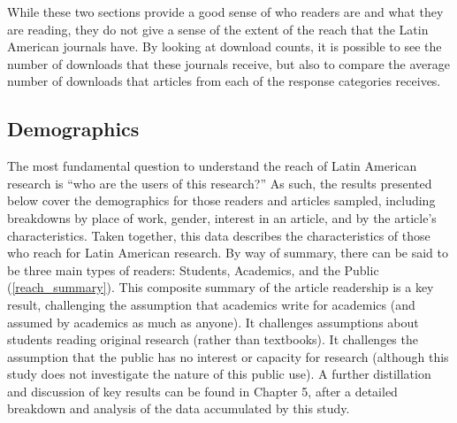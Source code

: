 While these two sections provide a good sense of who readers are and what they are reading, they do not give a sense of the extent of the reach that the Latin American journals have. By looking at download counts, it is possible to see the number of downloads that these journals receive, but also to compare the average number of downloads that articles from each of the response categories receives.

\subsection{Demographics}
\label{demographics}

The most fundamental question to understand the reach of Latin American research is ``who are the users of this research?'' As such, the results presented below cover the demographics for those readers and articles sampled, including breakdowns by place of work, gender, interest in an article, and by the article's characteristics. Taken together, this data describes the characteristics of those who reach for Latin American research. By way of summary, there can be said to be three main types of readers: Students, Academics, and the Public (\autoref{reach_summary}). This composite summary of the article readership is a key result, challenging the assumption that academics write for academics (and assumed by academics as much as anyone). It challenges assumptions about students reading original research (rather than textbooks). It challenges the assumption that the public has no interest or capacity for research (although this study does not investigate the nature of this public use). A further distillation and discussion of key results can be found in Chapter 5, after a detailed breakdown and analysis of the data accumulated by this study.



